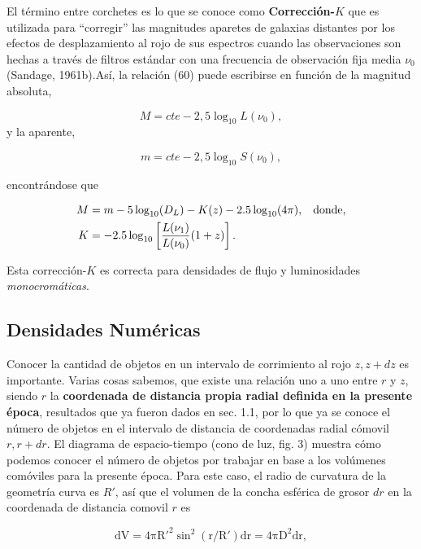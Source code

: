 \documentclass[11pt]{article}
\begin{document}
    El término entre corchetes es lo que se conoce como {\bf{Corrección-$K$}} que es utilizada para ``corregir'' las magnitudes aparetes de galaxias distantes por los efectos de desplazamiento al rojo de sus espectros cuando las observaciones son hechas a través de filtros estándar con una frecuencia de observación fija media $\nu_0$ (Sandage, 1961b).Así, la relación (60) puede escribirse en función de la magnitud absoluta, 
    
    $$M = cte - 2,5 \log_{10} L(\nu_0),$$ 
    y la aparente, 
    
    $$m = cte - 2,5 \log_{10} S(\nu_0),$$ 
    
    encontrándose que
    
    \begin{align}
        M & = m - 5 \log_{10} (D_L) - K(z) - 2.5 \log_{10} (4\pi), \hspace{0.3cm} \text{donde}, \\
        K & = -2.5 \log_{10} \left[ \frac{L(\nu_1)}{L(\nu_0)}(1+z) \right].
    \end{align}
        
    Esta corrección-$K$ es correcta para densidades de flujo y luminosidades \\ 
    {\textit{monocromáticas}}.
    
\subsection{Densidades Numéricas}

    Conocer la cantidad de objetos en un intervalo de corrimiento al rojo $z, z + dz$ es importante. Varias cosas sabemos, que existe una relación uno a uno entre $r$ y $z$, siendo $r$ la {\bf{coordenada de distancia propia radial definida en la presente época}}, resultados que ya fueron dados en sec. 1.1, por lo que ya se conoce el número de objetos en el intervalo de distancia de coordenadas radial cómovil $r, r+dr$. El diagrama de espacio-tiempo (cono de luz, fig. 3) muestra cómo podemos conocer el número de objetos por trabajar en base a los volúmenes comóviles para la presente época. Para este caso, el radio de curvatura de la geometría curva es $R'$, así que el volumen de la concha esférica de grosor $dr$ en la coordenada de distancia comovil $r$ es

    \begin{equation}
        \mathrm{ dV = 4\pi R'^2 \sin^2 (r/R') dr = 4\pi D^2 dr, }
    \end{equation}
\end{document}
